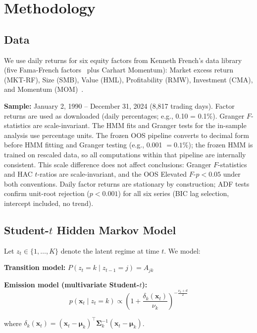 \documentclass[sigconf,anonymous]{acmart}
\begin{document}
\section{Methodology}

\subsection{Data}

We use daily returns for six equity factors from Kenneth French's data library~\cite{french2024data} (five Fama-French factors~\cite{fama2015five} plus Carhart Momentum):
Market excess return (MKT-RF), Size (SMB), Value (HML), Profitability (RMW),
Investment (CMA), and Momentum (MOM)~\cite{jegadeesh1993returns,carhart1997persistence}.

\textbf{Sample:} January 2, 1990 -- December 31, 2024 (8,817 trading days).
Factor returns are used as downloaded (daily percentages; e.g., 0.10 = 0.1\%).
Granger $F$-statistics are scale-invariant. The HMM fits and Granger tests for the
in-sample analysis use percentage units. The frozen OOS pipeline converts to decimal form
before HMM fitting and Granger testing (e.g., 0.001 $= 0.1\%$); the frozen HMM is trained
on rescaled data, so all computations within that pipeline are internally consistent.
This scale difference does not affect conclusions: Granger $F$-statistics and HAC $t$-ratios
are scale-invariant, and the OOS Elevated $F$-$p < 0.05$ under both conventions.
Daily factor returns are stationary by construction; ADF tests confirm unit-root
rejection ($p < 0.001$) for all six series (BIC lag selection, intercept included,
no trend).

\subsection{Student-\texorpdfstring{$t$}{t} Hidden Markov Model}
\label{sec:hmm}

Let $z_t \in \{1, \ldots, K\}$ denote the latent regime at time $t$. We model:

\textbf{Transition model:}
$P(z_t = k \mid z_{t-1} = j) = A_{jk}$

\textbf{Emission model (multivariate Student-$t$):}
\begin{equation}
p(\mathbf{x}_t \mid z_t = k) \propto \left(1 + \frac{\delta_k(\mathbf{x}_t)}{\nu_k}\right)^{-\frac{\nu_k+d}{2}}
\end{equation}

where $\delta_k(\mathbf{x}_t) = (\mathbf{x}_t - \boldsymbol{\mu}_k)^\top\boldsymbol{\Sigma}_k^{-1}(\mathbf{x}_t - \boldsymbol{\mu}_k)$.
\end{document}
